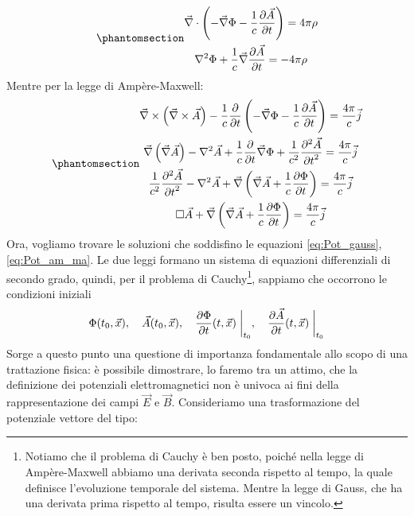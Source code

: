 \begin{equation}\phantomsection\label{eq:Pot_gauss}
\begin{gathered}
    \Vec{\nabla}\cdot\left(-\Vec{\nabla}\Phi-\dfrac{1}{c}\dfrac{\partial\Vec{A}}{\partial t}\right)=4\pi\rho\\
    \nabla^2\Phi+\dfrac{1}{c}\Vec{\nabla}\dfrac{\partial\Vec{A}}{\partial t}=-4\pi\rho
\end{gathered}   
\end{equation}
Mentre per la legge di Ampère-Maxwell:
\begin{equation}\phantomsection\label{eq:Pot_am_ma}
\begin{gathered}
    \Vec{\nabla}\times\left(\Vec{\nabla}\times\Vec{A}\right)-\dfrac{1}{c}\dfrac{\partial}{\partial t}\left(-\Vec{\nabla}\Phi-\dfrac{1}{c}\dfrac{\partial\Vec{A}}{\partial t}\right)=\dfrac{4\pi}{c}\Vec{j}\\
    \Vec{\nabla}\left(\Vec{\nabla}\Vec{A}\right)-\nabla^2\Vec{A}+\dfrac{1}{c}\dfrac{\partial}{\partial t}\Vec{\nabla}\Phi+\dfrac{1}{c^2}\dfrac{\partial^2\Vec{A}}{{\partial t}^2}=\dfrac{4\pi}{c}\Vec{j}\\
     \dfrac{1}{c^2}\dfrac{\partial^2\Vec{A}}{{\partial t}^2}-\nabla^2\Vec{A}+\Vec{\nabla}\left(\Vec{\nabla}\Vec{A} +\dfrac{1}{c}\dfrac{\partial\Phi}{\partial t}\right)=\dfrac{4\pi}{c}\Vec{j}\\
     \Box \Vec{A}+\Vec{\nabla}\left(\Vec{\nabla}\Vec{A} +\dfrac{1}{c}\dfrac{\partial\Phi}{\partial t}\right)=\dfrac{4\pi}{c}\Vec{j}
\end{gathered}   
\end{equation}
Ora, vogliamo trovare le soluzioni che soddisfino le equazioni \eqref{eq:Pot_gauss}, \eqref{eq:Pot_am_ma}.
Le due leggi formano un sistema di equazioni differenziali di secondo grado, quindi, per il problema di Cauchy\footnote{Notiamo che il problema di Cauchy è ben posto, poiché nella legge di Ampère-Maxwell abbiamo una derivata seconda rispetto al tempo, la quale definisce l'evoluzione temporale del sistema. Mentre la legge di Gauss, che ha una derivata prima rispetto al tempo, risulta essere un vincolo.}, sappiamo che occorrono le condizioni iniziali 
\begin{equation*}
    \Phi(t_0,\Vec{x}), \quad \Vec{A}(t_0,\Vec{x}), \quad \dfrac{\partial \Phi}{\partial t}(t,\Vec{x})\biggm|_{t_0}, \quad \dfrac{\partial \Vec{A}}{\partial t}(t,\Vec{x})\biggm|_{t_0}
\end{equation*}
Sorge a questo punto una questione di importanza fondamentale allo scopo di una trattazione fisica: è possibile dimostrare, lo faremo tra un attimo, che la definizione dei potenziali elettromagnetici non è univoca ai fini della rappresentazione dei campi $\Vec{E}$ e $\Vec{B}$. Consideriamo una trasformazione del potenziale vettore del tipo:
